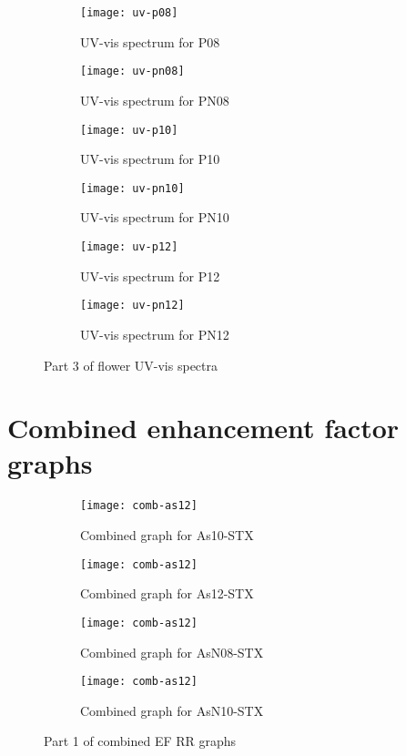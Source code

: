 \newpage

\begin{figure*}[h]
\centering
\begin{subfigure}{8.25cm}\centering\texttt{[image: uv-p08]}\caption{UV-vis spectrum for P08}\end{subfigure}%
\begin{subfigure}{8.25cm}\centering\texttt{[image: uv-pn08]}\caption{UV-vis spectrum for PN08}\end{subfigure}
\begin{subfigure}{8.25cm}\centering\texttt{[image: uv-p10]}\caption{UV-vis spectrum for P10}\end{subfigure}%
\begin{subfigure}{8.25cm}\centering\texttt{[image: uv-pn10]}\caption{UV-vis spectrum for PN10}\end{subfigure}
\begin{subfigure}{8.25cm}\centering\texttt{[image: uv-p12]}\caption{UV-vis spectrum for P12}\end{subfigure}%
\begin{subfigure}{8.25cm}\centering\texttt{[image: uv-pn12]}\caption{UV-vis spectrum for PN12}\end{subfigure}
\caption[Part 3 of flower UV-vis spectra]{Part 3 of flower UV-vis spectra}
\end{figure*}


\newpage
\section{Combined enhancement factor graphs}

\begin{figure*}[h]
\centering
\begin{subfigure}{8.25cm}\centering\texttt{[image: comb-as12]}\caption{Combined graph for As10-STX}\end{subfigure}%
\begin{subfigure}{8.25cm}\centering\texttt{[image: comb-as12]}\caption{Combined graph for As12-STX}\end{subfigure}
\begin{subfigure}{8.25cm}\centering\texttt{[image: comb-as12]}\caption{Combined graph for AsN08-STX}\end{subfigure}%
\begin{subfigure}{8.25cm}\centering\texttt{[image: comb-as12]}\caption{Combined graph for AsN10-STX}\end{subfigure}
\caption[Part 1 of combined EF RR graphs]{Part 1 of combined EF RR graphs}
\end{figure*}

